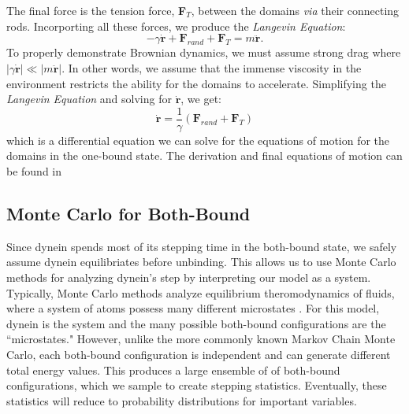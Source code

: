 The final force is the tension force, \textbf{F}$_T$, between the domains \textit{via} their connecting rods. Incorporting all these forces, we produce the \textit{Langevin Equation}:
\begin{equation}
	-\gamma \dot{\textbf{r}} + \textbf{F}_{rand} + \textbf{F}_T = m\ddot{\textbf{r}}.
\end{equation}
To properly demonstrate Brownian dynamics, we must assume strong drag where $|\gamma \dot{\textbf{r}}|\ll |m\ddot{\textbf{r}}|$. In other words, we assume that the immense viscosity in the environment restricts the ability for the domains to accelerate. Simplifying the \textit{Langevin Equation} and solving for $\dot{\textbf{r}}$, we get:
\begin{equation}
	\dot{\textbf{r}}=\frac{1}{\gamma}(\textbf{F}_{rand} + \textbf{F}_T)
\end{equation}
which is a differential equation we can solve for the equations of motion for the domains in the one-bound state. The derivation and final equations of motion can be found in \cite{Capek2017}


\subsection{Monte Carlo for Both-Bound}
Since dynein spends most of its stepping time in the both-bound state, we safely assume dynein equilibriates before unbinding. This allows us to use Monte Carlo methods for analyzing dynein's step by interpreting our model as a system. Typically, Monte Carlo methods analyze equilibrium theromodynamics of fluids, where a system of atoms possess many different microstates \cite{lim2007vorticity}. For this model, dynein is the system and the many possible both-bound configurations are the ``microstates." However, unlike the more commonly known Markov Chain Monte Carlo, each both-bound configuration is independent and can generate different total energy values. This produces a large ensemble of of both-bound configurations, which we sample to create stepping statistics. Eventually, these statistics will reduce to probability distributions for important variables.

